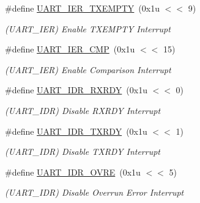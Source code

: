 \begin{DoxyCompactItemize}
\mbox{\label{group__SAME70__UART_gafb01f4aeae498bfbf583c41acfbd778a}} 
\#define \mbox{\hyperlink{group__SAME70__UART_gafb01f4aeae498bfbf583c41acfbd778a}{U\+A\+R\+T\+\_\+\+I\+E\+R\+\_\+\+T\+X\+E\+M\+P\+TY}}~(0x1u $<$$<$ 9)
\begin{DoxyCompactList}\small\item\em (U\+A\+R\+T\+\_\+\+I\+ER) Enable T\+X\+E\+M\+P\+TY Interrupt \end{DoxyCompactList}\item 
\mbox{\label{group__SAME70__UART_ga2004f929d93784f4d125359d25bfd6c6}} 
\#define \mbox{\hyperlink{group__SAME70__UART_ga2004f929d93784f4d125359d25bfd6c6}{U\+A\+R\+T\+\_\+\+I\+E\+R\+\_\+\+C\+MP}}~(0x1u $<$$<$ 15)
\begin{DoxyCompactList}\small\item\em (U\+A\+R\+T\+\_\+\+I\+ER) Enable Comparison Interrupt \end{DoxyCompactList}\item 
\mbox{\label{group__SAME70__UART_ga444de2ead3afe527844d4f09a5f261d7}} 
\#define \mbox{\hyperlink{group__SAME70__UART_ga444de2ead3afe527844d4f09a5f261d7}{U\+A\+R\+T\+\_\+\+I\+D\+R\+\_\+\+R\+X\+R\+DY}}~(0x1u $<$$<$ 0)
\begin{DoxyCompactList}\small\item\em (U\+A\+R\+T\+\_\+\+I\+DR) Disable R\+X\+R\+DY Interrupt \end{DoxyCompactList}\item 
\mbox{\label{group__SAME70__UART_gab9d2b444a3c078333a81dc83eb3858fa}} 
\#define \mbox{\hyperlink{group__SAME70__UART_gab9d2b444a3c078333a81dc83eb3858fa}{U\+A\+R\+T\+\_\+\+I\+D\+R\+\_\+\+T\+X\+R\+DY}}~(0x1u $<$$<$ 1)
\begin{DoxyCompactList}\small\item\em (U\+A\+R\+T\+\_\+\+I\+DR) Disable T\+X\+R\+DY Interrupt \end{DoxyCompactList}\item 
\mbox{\label{group__SAME70__UART_ga7a2a8e703f4c639df2f6f9dce347f75d}} 
\#define \mbox{\hyperlink{group__SAME70__UART_ga7a2a8e703f4c639df2f6f9dce347f75d}{U\+A\+R\+T\+\_\+\+I\+D\+R\+\_\+\+O\+V\+RE}}~(0x1u $<$$<$ 5)
\begin{DoxyCompactList}\small\item\em (U\+A\+R\+T\+\_\+\+I\+DR) Disable Overrun Error Interrupt \end{DoxyCompactList}\item 
$$
\end{DoxyCompactItemize}
